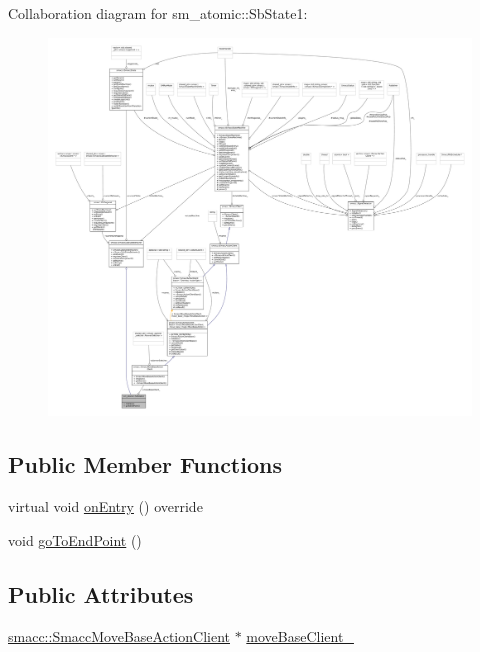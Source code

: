Collaboration diagram for sm\+\_\+atomic\+:\+:Sb\+State1\+:
\nopagebreak
\begin{figure}[H]
\begin{center}
\leavevmode
\includegraphics[width=350pt]{structsm__atomic_1_1SbState1__coll__graph}
\end{center}
\end{figure}
\subsection*{Public Member Functions}
\begin{DoxyCompactItemize}
\item 
virtual void \hyperlink{structsm__atomic_1_1SbState1_a92129ca822feec753ba87a7a90f4ed18}{on\+Entry} () override
\item 
void \hyperlink{structsm__atomic_1_1SbState1_abea75039dfd4bdcde294d9970972c8f5}{go\+To\+End\+Point} ()
\end{DoxyCompactItemize}
\subsection*{Public Attributes}
\begin{DoxyCompactItemize}
\item 
\hyperlink{classsmacc_1_1SmaccMoveBaseActionClient}{smacc\+::\+Smacc\+Move\+Base\+Action\+Client} $\ast$ \hyperlink{structsm__atomic_1_1SbState1_a4fd1f56e000ae75c78903b338cf4c189}{move\+Base\+Client\+\_\+}
\end{DoxyCompactItemize}


